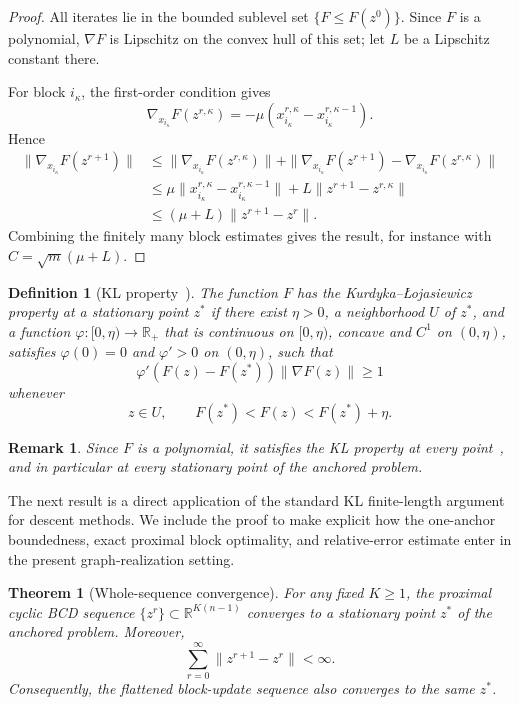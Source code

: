 \documentclass[11pt]{article}
\newtheorem{theorem}{Theorem}
\newtheorem{definition}{Definition}
\newtheorem{remark}{Remark}
\begin{document}
\begin{proof}
All iterates lie in the bounded sublevel set \(\{F\le F(z^0)\}\).  Since \(F\) is a polynomial, \(\nabla F\) is Lipschitz on the convex hull of this set; let \(L\) be a Lipschitz constant there.

For block \(i_\kappa\), the first-order condition gives
\[
    \nabla_{x_{i_\kappa}}F(z^{r,\kappa})
    =
    -\mu
    \left(x_{i_\kappa}^{r,\kappa}-x_{i_\kappa}^{r,\kappa-1}\right).
\]
Hence
\[
\begin{aligned}
    \|\nabla_{x_{i_\kappa}}F(z^{r+1})\|
    &\le
    \|\nabla_{x_{i_\kappa}}F(z^{r,\kappa})\|
    +
    \|\nabla_{x_{i_\kappa}}F(z^{r+1})
      -\nabla_{x_{i_\kappa}}F(z^{r,\kappa})\|  \\
    &\le
    \mu
    \|x_{i_\kappa}^{r,\kappa}-x_{i_\kappa}^{r,\kappa-1}\|
    +
    L\|z^{r+1}-z^{r,\kappa}\| \\
    &\le
    (\mu+L)\|z^{r+1}-z^r\|.
\end{aligned}
\]
Combining the finitely many block estimates gives the result, for instance with \(C=\sqrt{m}(\mu+L)\).
\end{proof}

\begin{definition}[KL property~\cite{attouch2010proximal,attouch2013convergence,bolte2014proximal}]
The function \(F\) has the Kurdyka--\L{}ojasiewicz property at a stationary point \(z^*\) if there exist \(\eta>0\), a neighborhood \(U\) of \(z^*\), and a function \(\varphi:[0,\eta)\to\mathbb R_+\) that is continuous on \([0,\eta)\), concave and \(C^1\) on \((0,\eta)\), satisfies \(\varphi(0)=0\) and \(\varphi'>0\) on \((0,\eta)\), such that
\[
    \varphi'(F(z)-F(z^*))\|\nabla F(z)\|\ge1
\]
whenever
\[
    z\in U,\qquad F(z^*)<F(z)<F(z^*)+\eta.
\]
\end{definition}

\begin{remark}
Since \(F\) is a polynomial, it satisfies the KL property at every point~\cite{attouch2013convergence,bolte2014proximal}, and in particular at every stationary point of the anchored problem.
\end{remark}

The next result is a direct application of the standard KL finite-length argument for descent methods.  We include the proof to make explicit how the one-anchor boundedness, exact proximal block optimality, and relative-error estimate enter in the present graph-realization setting.

\begin{theorem}[Whole-sequence convergence]
For any fixed \(K\ge1\), the proximal cyclic BCD sequence \(\{z^r\}\subset\mathbb R^{K(n-1)}\) converges to a stationary point \(z^*\) of the anchored problem.  Moreover,
\[
    \sum_{r=0}^{\infty}\|z^{r+1}-z^r\|<\infty.
\]
Consequently, the flattened block-update sequence also converges to the same \(z^*\).
\end{theorem}
\end{document}
